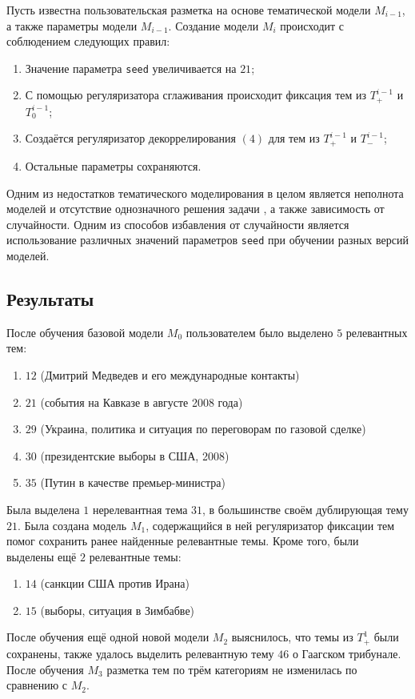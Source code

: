 \documentclass{article}
\begin{document}
Пусть известна пользовательская разметка на основе тематической модели $M_{i - 1}$, а также параметры модели $M_{i - 1}$.
Создание модели $M_i$ происходит с соблюдением следующих правил:
\begin{enumerate}
    \item Значение параметра \texttt{seed} увеличивается на $21$;
    \item С помощью регуляризатора сглаживания происходит фиксация тем из $T_+^{i - 1}$ и $T_0^{i - 1}$;
    \item Создаётся регуляризатор декоррелирования $(4)$ для тем из $T_+^{i - 1}$ и $T_-^{i - 1}$;
    \item Остальные параметры сохраняются.
\end{enumerate}
Одним из недостатков тематического моделирования в целом является неполнота моделей и отсутствие однозначного решения задачи \citep{bigartm}, а также зависимость от случайности.
Одним из способов избавления от случайности является использование различных значений параметров \texttt{seed} при обучении разных версий моделей.

\subsection{Результаты}

После обучения базовой модели $M_0$ пользователем было выделено $5$ релевантных тем:

\begin{enumerate}
    \item $12$ (Дмитрий Медведев и его международные контакты)
    \item $21$ (события на Кавказе в августе 2008 года)
    \item $29$ (Украина, политика и ситуация по переговорам по газовой сделке)
    \item $30$ (президентские выборы в США, 2008)
    \item $35$ (Путин в качестве премьер-министра)
\end{enumerate}

Была выделена $1$ нерелевантная тема $31$, в большинстве своём дублирующая тему $21$.
Была создана модель $M_1$, содержащийся в ней регуляризатор фиксации тем помог сохранить ранее найденные релевантные темы.
Кроме того, были выделены ещё $2$ релевантные темы:
\begin{enumerate}
    \item $14$ (санкции США против Ирана)
    \item $15$ (выборы, ситуация в Зимбабве)
\end{enumerate}
После обучения ещё одной новой модели $M_2$ выяснилось, что темы из $T_+^1$ были сохранены, также удалось выделить релевантную тему $46$ о Гаагском трибунале.
После обучения $M_3$ разметка тем по трём категориям не изменилась по сравнению с $M_2$.
\end{document}
